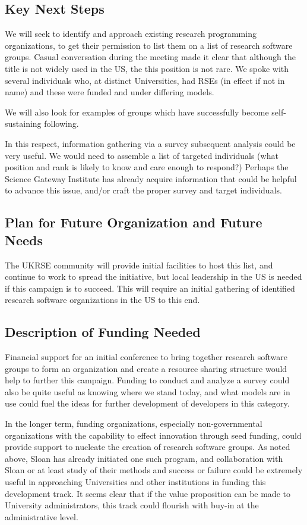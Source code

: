 \subsection{Key Next Steps}

We will seek to identify and approach existing research programming organizations,
to get their permission to list them on a list of research software groups.
Casual conversation during the meeting made it clear that although the title is not
widely used in the US, the this position is not rare. We spoke with several individuals
who, at distinct Universities, had RSEs (in effect if not in name) and these were funded
and under differing models. 

We will also look for examples of groups which have successfully become self-
sustaining following. 

In this respect, information gathering via a survey subsequent analysis could be very useful.
We would need to assemble a list of targeted individuals (what position and rank is
likely to know and care enough to respond?) Perhaps the Science Gateway Institute has already acquire
information that could be helpful to advance this issue, and/or craft the proper survey and target
individuals. 

\subsection{Plan for Future Organization and Future Needs}

The UKRSE community will provide initial facilities to host this list, and
continue to work to spread the initiative, but local leadership in the US
is needed if this campaign is to succeed. This will require an initial gathering
of identified research software organizations in the US to this end.

\subsection{Description of Funding Needed}

Financial support for an initial conference to bring together research software
groups to form an organization and create a resource sharing structure would
help to further this campaign. Funding to conduct and analyze a survey could also be quite useful
as knowing where we stand today, and what models are in use could fuel the ideas for further
development of developers in this category.

In the longer term, funding organizations, especially non-governmental organizations
with the capability to effect innovation through seed funding, could provide
support to nucleate the creation of research software groups. As noted above, Sloan has already
initiated one such program, and collaboration with Sloan or at least study of their methods and 
success or failure could be extremely useful in approaching Universities and other institutions 
in funding this development track. It seems clear that if the value proposition can be made to
University administrators, this track could flourish with buy-in at the administrative level.  

